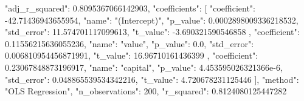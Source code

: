 {
  "adj_r_squared": 0.8095367066142903,
  "coefficients": [
    {
      "coefficient": -42.71436943655954,
      "name": "(Intercept)",
      "p_value": 0.0002898009336218532,
      "std_error": 11.574701117099613,
      "t_value": -3.690321590546858
    },
    {
      "coefficient": 0.11556215636055236,
      "name": "value",
      "p_value": 0.0,
      "std_error": 0.006810954456871991,
      "t_value": 16.96710161436399
    },
    {
      "coefficient": 0.23067848873196917,
      "name": "capital",
      "p_value": 4.453595026321366e-6,
      "std_error": 0.048865539534342216,
      "t_value": 4.720678231125446
    }
  ],
  "method": "OLS Regression",
  "n_observations": 200,
  "r_squared": 0.8124080125447282
}

